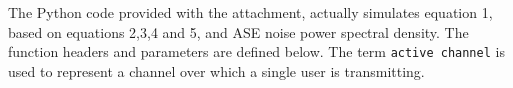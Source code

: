 \documentclass[10pt,letterpaper]{article}
\newcommand{\nl}{\newline\newline}
\begin{document}
The Python code provided with the attachment, actually simulates equation 1, based on equations 2,3,4 and 5, and ASE noise power spectral density. The function headers and parameters are defined below. The term \texttt{active channel} is used to represent a channel over which a single user is transmitting.
\end{document}
